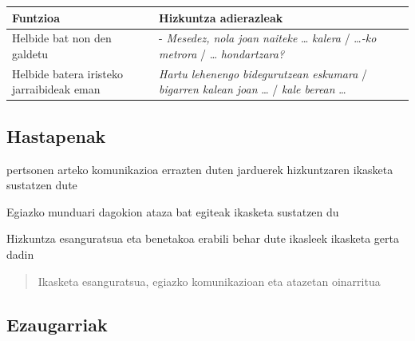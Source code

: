 \documentclass[
]{book}
\providecommand{\tightlist}{%
  \setlength{\itemsep}{0pt}\setlength{\parskip}{0pt}}
\begin{document}
\begin{longtable}[]{@{}
  >{\raggedright\arraybackslash}p{}
  >{\raggedright\arraybackslash}p{}@{}}
\toprule
Funtzioa & Hizkuntza adierazleak \\
\midrule
\endhead
Helbide bat non den galdetu & - \emph{Mesedez, nola joan naiteke} \ldots{} \emph{kalera} / \ldots{}\emph{-ko metrora} / \ldots{} \emph{hondartzara?} \\
Helbide batera iristeko jarraibideak eman & \emph{Hartu lehenengo bidegurutzean eskumara} / \emph{bigarren kalean joan} \ldots{} / \emph{kale berean} \ldots{} \\
\bottomrule
\end{longtable}

\hypertarget{hastapenak}{%
\subsection{Hastapenak}\label{hastapenak}}

\begin{description}
\tightlist
\item[Komunikazioa]
pertsonen arteko komunikazioa errazten duten jarduerek hizkuntzaren ikasketa sustatzen dute
\item[Ataza]
Egiazko munduari dagokion ataza bat egiteak ikasketa sustatzen du
\item[Esanguratsua]
Hizkuntza esanguratsua eta benetakoa erabili behar dute ikasleek ikasketa gerta dadin
\end{description}

\begin{quote}
Ikasketa esanguratsua, egiazko komunikazioan eta atazetan oinarritua
\end{quote}

\hypertarget{ezaugarriak}{%
\subsection{Ezaugarriak}\label{ezaugarriak}}
\end{document}
